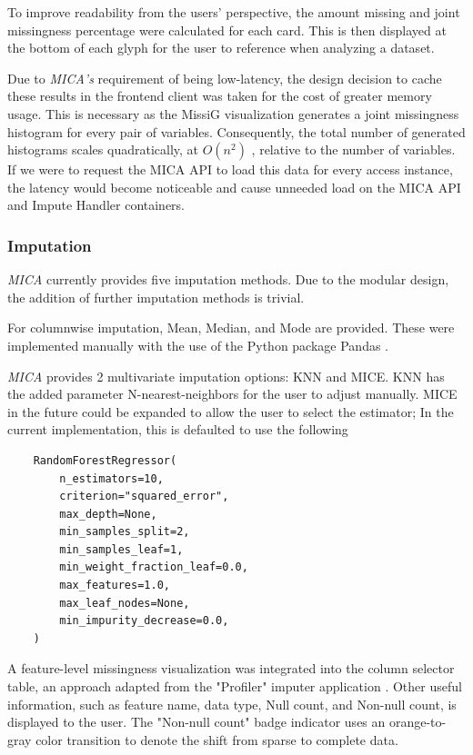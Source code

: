 \documentclass[a4paper, 11pt]{article}
\newcommand{\mica}{\textit{MICA }}
\newcommand{\micas}{\textit{MICA's }}
\begin{document}
To improve readability from the users' perspective, the amount missing and joint
missingness percentage were calculated for each card. This is then displayed at
the bottom of each glyph for the user to reference when analyzing a dataset.

Due to \micas requirement of being low-latency, the design decision to cache
these results in the frontend client was taken for the cost of greater memory
usage. This is necessary as the MissiG visualization generates a joint
missingness histogram for every pair of variables. Consequently, the total
number of generated histograms scales quadratically, at \( O(n^2) \) , relative
to the number of variables. If we were to request the MICA API to load this
data for every access instance, the latency would become noticeable and cause
unneeded load on the MICA API and Impute Handler containers.

\subsubsection{Imputation}
\mica currently provides five imputation methods. Due to the modular design,
the addition of further imputation methods is trivial. 

For columnwise imputation, Mean, Median, and Mode are provided. These were
implemented manually with the use of the Python package Pandas
\cite{noauthor_pandas_nodate}.

\mica provides 2 multivariate imputation options: KNN and MICE. KNN has the
added parameter N-nearest-neighbors for the user to adjust manually. MICE in
the future could be expanded to allow the user to select the estimator; In the
current implementation, this is defaulted to use the following 
\begin{verbatim}
    RandomForestRegressor(
        n_estimators=10,
        criterion="squared_error",
        max_depth=None,
        min_samples_split=2,
        min_samples_leaf=1,
        min_weight_fraction_leaf=0.0,
        max_features=1.0,
        max_leaf_nodes=None,
        min_impurity_decrease=0.0,
    )
\end{verbatim}

A feature-level missingness visualization was integrated into the column
selector table, an approach adapted from the "Profiler" imputer application
\cite{kandel_profiler_2012}. Other useful information, such as feature name,
data type, Null count, and Non-null count, is displayed to the user. The
"Non-null count" badge indicator uses an orange-to-gray color transition to
denote the shift from sparse to complete data.
\end{document}
